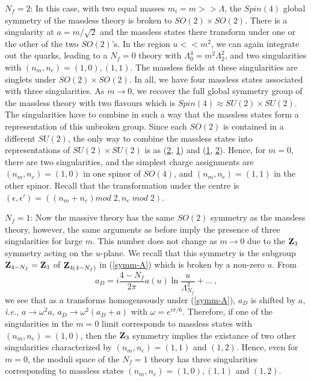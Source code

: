 \noindent\underline{$N_f = 2$}:
In this case, with two equal masses $m_i=m >>\Lambda$, the $Spin(4)$
global symmetry of the massless theory is broken to $SO(2)
\times SO(2)$. There is a singularity at $a = m/ \sqrt{2}$ and the
massless states there transform under one or the other of the two
$SO(2)$'s. In the region $u<<m^2$, we can again integrate out the
quarks, leading to a $N_f=0$ theory with $\Lambda^4_0=m^2\Lambda^2_2$,
and two singularities with $(n_m, n_e) = (1,0), (1,1)$. The massless
fields at these singularities are singlets under $SO(2)\times SO(2)$.
In all, we have four massless states associated with three
singularities. As $m \rightarrow 0$, we recover the full global
symmetry group of the massless theory with two flavours which is 
$Spin (4) \approx SU(2) \times SU(2)$. The singularities have to
combine in such a way that the massless states form a representation
of this unbroken group. Since each $SO(2)$ is contained in a different
$SU(2)$, the only way to combine the massless states into
representations of $SU(2)\times SU(2)$ is as (\underline{2},
\underline{1}) and (\underline{1}, \underline{2}). Hence, for $m = 0$,
there are two singularities, and the simplest charge assignments are
$(n_m , n_e ) = (1,0)$ in one spinor of $SO(4)$, and $(n_m , n_e ) =
(1,1)$ in the other spinor. Recall that the transformation under the
centre is $(\epsilon,\epsilon')=((n_m+n_e) mod\; 2, n_e\; mod\;2)$. 

\noindent\underline{$N_f=1$}:
Now the massive theory has the same $SO(2)$ symmetry as the massless
theory, however, the same arguments as before imply the presence of
three singularities for large $m$. This number does not change as
$m\rightarrow 0$ due to the ${\bf Z}_3$ symmetry acting on the
$u$-plane. We recall that this symmetry is the subgroup ${\bf
Z}_{4-N_f}={\bf Z}_{3}$ of ${\bf Z}_{4(4-N_f)}$ in (\ref{symm-A})
which is broken by a non-zero $u$. From 
$$
a_D = i \frac{4-N_f}{2\pi} a(u) \ln \frac{u}{\Lambda^2_{N_f}}+...\,,
$$
we see that as $a$ transforms homogeneously under (\ref{symm-A}),
$a_D$ is shifted by $a$, {\it i.e.}, $a\rightarrow \omega^2 a$, $a_D
\rightarrow \omega^2 (a_D + a)$ with $\omega = e^{i\pi/6}$. Therefore,
if one of the singularities in the $m=0$ limit corresponds to massless
states with $(n_m , n_e ) = (1,0)$, then the ${\bf Z}_3$ symmetry
implies the existance of two other singularities characterized by
$(n_m , n_e )= (1,1)$ and $(1,2)$. Hence, even for $m=0$, the moduli
space of the $N_f=1$ theory has three singularities corresponding to
massless states $(n_m , n_e )= (1,0), (1,1)$ and $(1,2)$.

